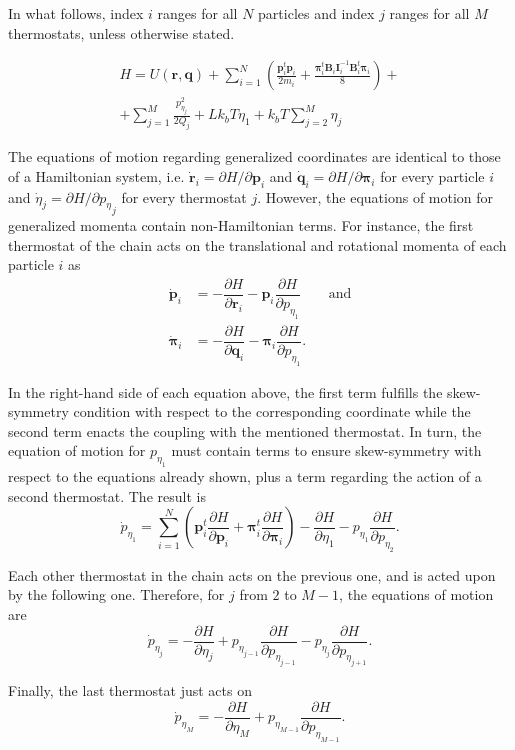 \documentclass[aip,jcp,reprint,amsmath,amssymb,amsfont]{revtex4-1}
\newcommand{\mt}[1]{\boldsymbol{\mathbf{#1}}}           %
\newcommand{\vt}[1]{\boldsymbol{\mathbf{#1}}}           %
\newcommand{\tr}[1]{#1^t}                               %
\newcommand{\diff}[2]{\dfrac{\partial #1}{\partial #2}} %
\begin{document}
In what follows, index $i$ ranges for all $N$ particles and index $j$ ranges for all $M$ thermostats, unless otherwise stated.

\begin{equation}
\label{eq:H_nvt}
\begin{split}
H = U(\vt r, \vt q) + \sum_{i=1}^N \left( \frac{\tr{\vt p}_i {\vt p}_i}{2 m_i} + \frac{\tr{\vt \pi}_i {\mt B}_i {\mt I}_i^{-1} \tr{\mt B}_i {\vt \pi}_i}{8} \right) + \\
+ \sum_{j=1}^{M}\frac{p_{\eta_j}^2}{2Q_j} + L k_bT\eta_1 + k_bT\sum_{j=2}^M \eta_j
\end{split}
\end{equation}

The equations of motion regarding generalized coordinates are identical to those of a Hamiltonian system, i.e. $\dot{\vt r}_i = {\partial H}/{\partial \vt p_i}$ and $\dot{\vt q}_i = {\partial H}/{\partial \vt \pi_i}$ for every particle $i$ and $\dot{\eta}_j = {\partial H}/{\partial {p_\eta}_j}$ for every thermostat $j$. However, the equations of motion for generalized momenta contain non-Hamiltonian terms. For instance, the first thermostat of the chain acts on the translational and rotational momenta of each particle $i$ as
\[
\begin{split}
\dot{\vt p}_i &= -\diff{H}{\vt r_i} - {\vt p}_i \diff{H}{p_{\eta_1}} \qquad \text{and}\\
\dot{\vt \pi}_i &= -\diff{H}{\vt q_i} - {\vt \pi}_i \diff{H}{p_{\eta_1}}.
\end{split}
\]

In the right-hand side of each equation above, the first term fulfills the skew-symmetry condition with respect to the corresponding coordinate while the second term enacts the coupling with the mentioned thermostat. In turn, the equation of motion for $p_{\eta_1}$ must contain terms to ensure skew-symmetry with respect to the equations already shown, plus a term regarding the action of a second thermostat. The result is
\[
{\dot p}_{\eta_1} = \sum_{i=1}^N \left( \tr{\vt p_i} \diff{H}{\vt p_i} + \tr{\vt \pi_i} \diff{H}{\vt \pi_i}\right) - \diff{H}{\eta_1} - p_{\eta_1} \diff{H}{p_{\eta_2}}.
\]

Each other thermostat in the chain acts on the previous one, and is acted upon by the following one. Therefore, for $j$ from $2$ to $M-1$, the equations of motion are
\[
{\dot p}_{\eta_j} = -\diff{H}{\eta_j} + p_{\eta_{j-1}} \diff{H}{p_{\eta_{j-1}}} - p_{\eta_j} \diff{H}{p_{\eta_{j+1}}}.
\]

Finally, the last thermostat just acts on 
\[
{\dot p}_{\eta_M} = -\diff{H}{\eta_M} + p_{\eta_{M-1}} \diff{H}{p_{\eta_{M-1}}}.
\]
\end{document}
